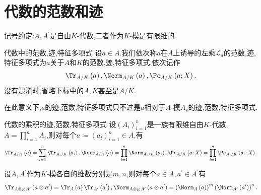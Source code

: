 \section{代数的范数和迹}

记号约定:$A,A^{\prime}$是自由$K$-代数,二者作为$K$-模是有限维的.

\begin{definition}{代数中的范数,迹,特征多项式}{}
	设$a\in A$.我们依次称$a$在$A$上诱导的左乘$\mathcal{L}_{a}$的范数,迹,特征多项式为$a$关于$A$和$K$的范数,迹,特征多项式,依次记作
	\begin{align*}
		\Tr_{A/K}\left(a\right),\Norm_{A/K}\left(a\right),\Pc_{A/K}\left(a;X\right).
	\end{align*}
	没有混淆时,省略下标中的$A,K$甚至是$A/K$.
\end{definition}

\begin{remark}{}{}
	在此意义下,$a$的迹,范数,特征多项式只不过是$a$相对于$A$-模$A_{s}$的迹,范数,特征多项式.
\end{remark}

\begin{proposition}{代数的乘积的迹,范数,特征多项式}{}
	设$\left(A_{i}\right)_{i=1}^{n}$是一族有限维自由$K$-代数,$A=\prod\limits_{i=1}^{n}A_{i}$,则对每个$a\coloneq\left(a_{i}\right)_{i=1}^{n}\in A$,有
	\begin{align*}
		\Tr_{A/K}\left(a\right)=\sum\limits_{i=1}^{n}\Tr_{A_{i}/K}\left(a_{i}\right),
		\Norm_{A/K}\left(a\right)=\prod\limits_{i=1}^{n}\Norm_{A_{i}/K}\left(a_{i}\right),
		\Pc_{A/K}\left(a;X\right)=\prod\limits_{i=1}^{n}\Pc_{A_{i}/K}\left(a_{i};X\right).
	\end{align*}
\end{proposition}

\begin{proposition}{}{}
	设$A,A^{\prime}$作为$K$-模各自的维数分别是$m,n$,则对每个$a\in A,a^{\prime}\in A^{\prime}$有
	\begin{align*}
		\Tr_{A\otimes_{K}A^{\prime}}\left(a\otimes a^{\prime}\right)=\Tr_{A}\left(a\right)\Tr_{A^{\prime}}\left(a^{\prime}\right),
		\Norm_{A\otimes_{K}A^{\prime}}\left(a\otimes a^{\prime}\right)=\left(\Norm_{A}\left(a\right)\right)^{m}\left(\Norm_{A^{\prime}}\left(a^{\prime}\right)\right)^{n}.
	\end{align*}
\end{proposition}

